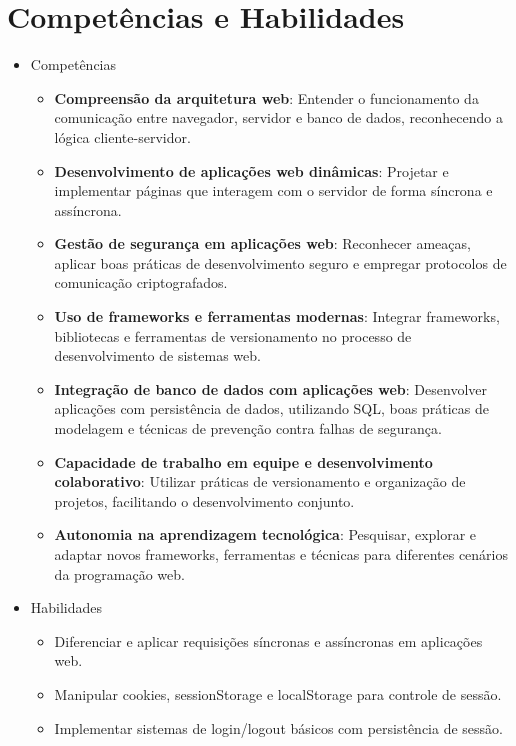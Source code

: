 \documentclass[a4paper, 12pt]{article}
\begin{document}
\section{Competências e Habilidades}

\begin{itemize}
    \item Competências
        \begin{itemize}
            \item\textbf{ Compreensão da arquitetura web}: Entender o funcionamento da comunicação entre navegador, servidor e banco de dados, reconhecendo a lógica cliente-servidor.
            \item \textbf{Desenvolvimento de aplicações web dinâmicas}: Projetar e implementar páginas que interagem com o servidor de forma síncrona e assíncrona.
            \item \textbf{Gestão de segurança em aplicações web}: Reconhecer ameaças, aplicar boas práticas de desenvolvimento seguro e empregar protocolos de comunicação criptografados.
            \item \textbf{Uso de frameworks e ferramentas modernas}: Integrar frameworks, bibliotecas e ferramentas de versionamento no processo de desenvolvimento de sistemas web.
            \item \textbf{Integração de banco de dados com aplicações web}: Desenvolver aplicações com persistência de dados, utilizando SQL, boas práticas de modelagem e técnicas de prevenção contra falhas de segurança.
            \item \textbf{Capacidade de trabalho em equipe e desenvolvimento colaborativo}: Utilizar práticas de versionamento e organização de projetos, facilitando o desenvolvimento conjunto.
            \item \textbf{Autonomia na aprendizagem tecnológica}: Pesquisar, explorar e adaptar novos frameworks, ferramentas e técnicas para diferentes cenários da programação web.
        \end{itemize}
    \item Habilidades
        \begin{itemize}
            \item Diferenciar e aplicar requisições síncronas e assíncronas em aplicações web.
            \item Manipular cookies, sessionStorage e localStorage para controle de sessão.
            \item Implementar sistemas de login/logout básicos com persistência de sessão.

\end{itemize}
\end{itemize}
\end{document}
